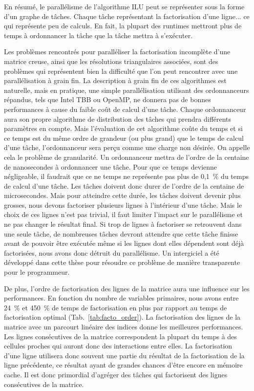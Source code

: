 En résumé, le parallélisme de l'algorithme ILU peut se représenter sous la forme d'un graphe de tâches.
%
Chaque tâche représentant la factorisation d'une ligne... ce qui représente peu de calculs.
%
En fait, la plupart des runtimes mettront plus de temps à ordonnancer la tâche que la tâche mettra à s'exécuter.

Les problèmes rencontrés pour paralléliser la factorisation incomplète d'une matrice creuse, ainsi que les résolutions triangulaires associées, sont des problèmes qui représentent bien la difficulté que l'on peut rencontrer avec une parallélisation à grain fin.
%
La description à grain fin de ces algorithmes est naturelle, mais en pratique, une simple parallélisation utilisant des ordonnanceurs répandus, tels que Intel TBB ou OpenMP, ne donnera pas de bonnes performances à cause du faible coût de calcul d'une tâche.
%
Chaque ordonnanceur aura son propre algorithme de distribution des tâches qui prendra différents paramètres en compte.
%
Mais l'évaluation de cet algorithme coûte du temps et si ce temps est du même ordre de grandeur (ou plus grand) que le temps de calcul d'une tâche, l'ordonnanceur sera perçu comme une charge non désirée.
%
On appelle cela le problème de granularité.
%
Un ordonnanceur mettra de l'ordre de la centaine de nanosecondes à ordonnancer une tâche.
%
Pour que ce temps devienne négligeable, il faudrait que ce ne temps ne représente pas plus de 0,1~\% du temps de calcul d'une tâche.
%
Les tâches doivent donc durer de l'ordre de la centaine de microsecondes.
%
Mais pour atteindre cette durée, les tâches doivent devenir plus grosses, nous devons factoriser plusieurs lignes à l'intérieur d'une tâche.
%
Mais le choix de ces lignes n'est pas trivial, il faut limiter l'impact sur le parallélisme et ne pas changer le résultat final.
%
Si trop de lignes à factoriser se retrouvent dans une seule tâche, de nombreuses tâches devront attendre que cette tâche finisse avant de pouvoir être exécutée même si les lignes dont elles dépendent sont déjà factorisées, nous avons donc détruit du parallélisme.
%
Un intergiciel a été développé dans cette thèse pour résoudre ce problème de manière transparente pour le programmeur.

De plus, l'ordre de factorisation des lignes de la matrice aura une influence sur les performances.
%
En fonction du nombre de variables primaires, nous avons entre 24~\% et 450~\% de temps de factorisation en plus par rapport au temps de factorisation optimal (Tab.~\ref{tab:facto_order}).
%
La factorisation des lignes de la matrice avec un parcourt linéaire des indices donne les meilleures performances.
%
Les lignes consécutives de la matrice correspondent la plupart du temps à des cellules proches qui auront donc des interactions entre elles.
%
La factorisation d'une ligne utilisera donc souvent une partie du résultat de la factorisation de la ligne précédente, ce résultat ayant de grandes chances d'être encore en mémoire cache.
%
Il est donc primordial d'agréger des tâches qui factorisent des lignes consécutives de la matrice.

